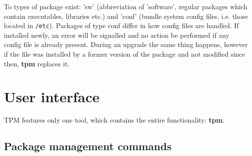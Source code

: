 \documentclass[a4paper]{article}
\newcommand{\file}[1]{\texttt{#1}}
\newcommand{\program}[1]{\textbf{#1}}
\begin{document}
	To types of package exist: 'sw' (abbreviation of 'software', regular packages which contain executables, libraries etc.) and 'conf' (bundle system config files, i.e. those located in \file{/etc}). Packages of type conf differ in how config files are handled. If installed newly, an error will be signalled and no action be performed if any config file is already present. During an upgrade the same thing happens, however if the file was installed by a former version of the package and not modified since then, \program{tpm} replaces it.
	
	\section{User interface}
	\label{sec:user_interface}
	
	TPM features only one tool, which contains the entire functionality: \program{tpm}.
	
	\subsection{Package management commands}
	\label{sec:package_management_commands}
	
\end{document}
